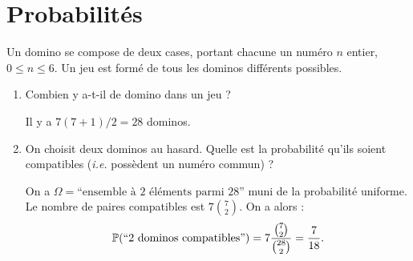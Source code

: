 \documentclass{article}
\begin{document}
\bigskip


\section{Probabilités}

 Un domino se compose de deux cases, portant chacune un numéro $n$ entier, $0\leq n \leq 6$. Un jeu est formé de tous les dominos différents possibles. 
\begin{enumerate}
	\item Combien y a-t-il de domino dans un jeu ?

	\medskip

Il y a  $7(7+1) /2 = 28$ dominos.

	\medskip

	\item On choisit deux dominos au hasard. Quelle est la probabilité qu'ils soient compatibles (\textit{i.e.} possèdent un numéro commun) ?

	\medskip

		On a  $\Omega =  \text{``ensemble à 2 éléments parmi 28''}$ muni de la probabilité uniforme. Le nombre de paires compatibles est $ 7 \binom 7 2$. On a alors : 
\[
	\P(\text{``2 dominos compatibles''}) =  7\frac{\binom 7 2}{\binom{28}{2}} = \frac{7}{18}.
\]

\end{enumerate}

\bigskip
\end{document}
